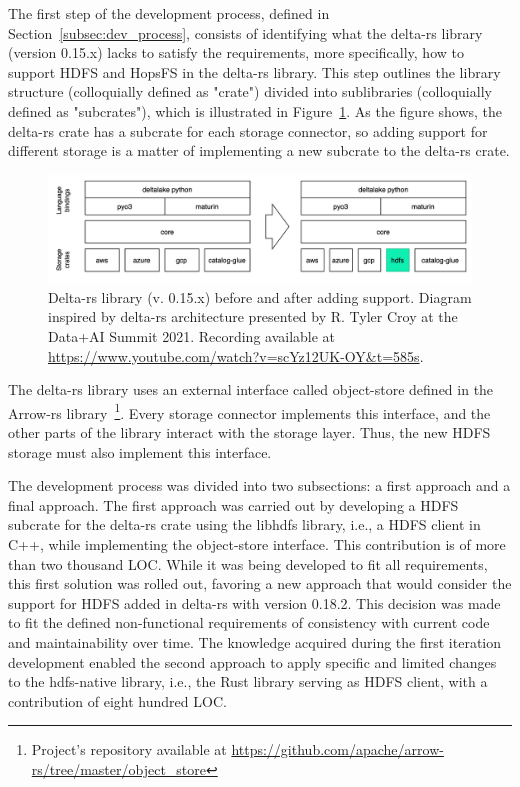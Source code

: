 
The first step of the development process, defined in Section~\ref{subsec:dev_process}, consists of identifying what the delta-rs library (version 0.15.x) lacks to satisfy the requirements, more specifically, how to support \gls{HDFS} and \gls{HopsFS} in the delta-rs library. This step outlines the library structure (colloquially defined as "crate") divided into sublibraries (colloquially defined as "subcrates"), which is illustrated in Figure~\ref{fig:delta-rs_schema}. As the figure shows, the delta-rs crate has a subcrate for each storage connector, so adding support for different storage is a matter of implementing a new subcrate to the delta-rs crate.

\begin{figure}[!ht]
    \begin{center}
      \includegraphics[width=\textwidth]{figures/4-implementation/delta-rs_schema.png}
    \caption[Delta-rs architecture before and after implementation]{Delta-rs library (v. 0.15.x) before and after adding  support. Diagram inspired by delta-rs architecture presented by R. Tyler Croy at the Data+AI Summit 2021. Recording available at \url{https://www.youtube.com/watch?v=scYz12UK-OY&t=585s}.}
    \label{fig:delta-rs_schema}
    \end{center}
\end{figure}

The delta-rs library uses an external interface called object-store defined in the Arrow-rs library~\footnote{Project's repository available at \url{https://github.com/apache/arrow-rs/tree/master/object_store}}. Every storage connector implements this interface, and the other parts of the library interact with the storage layer. Thus, the new \gls{HDFS} storage must also implement this interface.

The development process was divided into two subsections: a first approach and a final approach. The first approach was carried out by developing a \gls{HDFS} subcrate for the delta-rs crate using the libhdfs library, i.e., a \gls{HDFS} client in C++, while implementing the object-store interface. This contribution is of more than two thousand \gls{LOC}. While it was being developed to fit all requirements, this first solution was rolled out, favoring a new approach that would consider the support for \gls{HDFS} added in delta-rs with version 0.18.2. This decision was made to fit the defined non-functional requirements of consistency with current code and maintainability over time. The knowledge acquired during the first iteration development enabled the second approach to apply specific and limited changes to the hdfs-native library, i.e., the Rust library serving as \gls{HDFS} client, with a contribution of eight hundred \gls{LOC}.  

